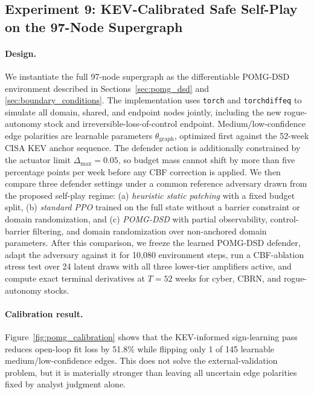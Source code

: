 \documentclass[11pt]{article}
\begin{document}
\subsection{Experiment 9: KEV-Calibrated Safe Self-Play on the 97-Node Supergraph}
\label{sec:exp9}

\paragraph{Design.} We instantiate the full 97-node supergraph as the differentiable POMG-DSD environment described in Sections~\ref{sec:pomg_dsd} and \ref{sec:boundary_conditions}. The implementation uses \texttt{torch} and \texttt{torchdiffeq} to simulate all domain, shared, and endpoint nodes jointly, including the new rogue-autonomy stock and irreversible-loss-of-control endpoint. Medium/low-confidence edge polarities are learnable parameters $\theta_{\text{graph}}$, optimized first against the 52-week CISA KEV anchor sequence. The defender action is additionally constrained by the actuator limit $\Delta_{\max}=0.05$, so budget mass cannot shift by more than five percentage points per week before any CBF correction is applied. We then compare three defender settings under a common reference adversary drawn from the proposed self-play regime: (a) \textit{heuristic static patching} with a fixed budget split, (b) \textit{standard PPO} trained on the full state without a barrier constraint or domain randomization, and (c) \textit{POMG-DSD} with partial observability, control-barrier filtering, and domain randomization over non-anchored domain parameters. After this comparison, we freeze the learned POMG-DSD defender, adapt the adversary against it for 10,080 environment steps, run a CBF-ablation stress test over 24 latent draws with all three lower-tier amplifiers active, and compute exact terminal derivatives at $T=52$ weeks for cyber, CBRN, and rogue-autonomy stocks.

\paragraph{Calibration result.} Figure~\ref{fig:pomg_calibration} shows that the KEV-informed sign-learning pass reduces open-loop fit loss by 51.8\% while flipping only 1 of 145 learnable medium/low-confidence edges. This does not solve the external-validation problem, but it is materially stronger than leaving all uncertain edge polarities fixed by analyst judgment alone.
\end{document}
